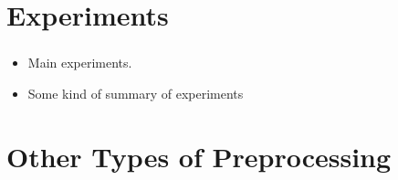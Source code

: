 \documentclass[english,notes]{beamer}
\begin{document}
\section{Experiments}

\begin{frame}
  \frametitle{\insertsection}
  \begin{itemize}
    \tiny
  \item Main experiments.
  \item Some kind of summary of experiments
  \end{itemize}
\end{frame}

\section{Other Types of Preprocessing}

\begin{frame}
  \frametitle{\insertsection}

\end{frame}
\end{document}

